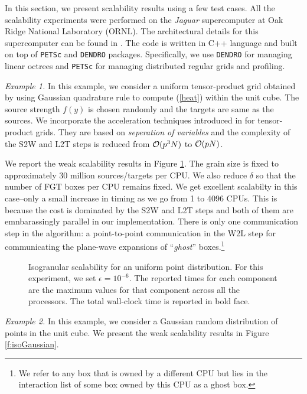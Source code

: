 In this section, we present scalability results using a few test cases.  All the scalability experiments were performed 
on the {\it{Jaguar}} supercomputer at Oak Ridge National Laboratory (ORNL). The architectural details for this supercomputer
 can be found in \cite{jaguar}. The code is written in C++ language and built on top of \texttt{PETSc} and \texttt{DENDRO} packages. 
 Specifically, we use \texttt{DENDRO} for managing linear octrees and \texttt{PETSc} for managing distributed regular grids and profiling. 


{\em Example 1.} In this example, we consider a uniform tensor-product grid obtained by using Gaussian quadrature rule to compute (\ref{heat}) within the unit cube. The source strength $f(y)$ is chosen randomly and the targets are same as the sources. We incorporate the acceleration techniques introduced in \cite{fggt} for tensor-product grids. They are based on 
{\em seperation of variables} and the complexity of the S2W and L2T steps is reduced from $\mathcal{O}(p^3 N)$ to $\mathcal{O}(p N)$. 

We report the weak scalability results in Figure \ref{f:isoUniform}. The grain size is fixed to approximately 30 million sources/targets per CPU. We also reduce $\delta$ so that the number of FGT boxes per CPU remains fixed. We get excellent scalabilty in this case--only a small increase in timing as we go from 1 to 4096 CPUs. This is  because the cost is dominated by the S2W and L2T steps and both of them are emnbarassingly parallel in our implementation. There is only one communication step in the algorithm: a point-to-point communication in the W2L step for communicating the plane-wave expansions of ``{\em ghost}'' boxes.\footnote{We refer to any box that
 is owned by a different CPU but lies in the interaction list of some box owned by this CPU as a ghost box.}

\begin{figure}
	\begin{center}
	
	\end{center}
\caption{\label{f:isoUniform} Isogranular scalability for an uniform point distribution. For
 this experiment, we set $\epsilon = 10^{-6}$. The reported times for 
each component are the maximum values for that component across all the processors. The total wall-clock
time is reported in bold face.} 
\end{figure}

{\em Example 2.} In this example, we consider a Gaussian random distribution of points in the unit cube. 
We present the weak scalability results in Figure \ref{f:isoGaussian}. 

